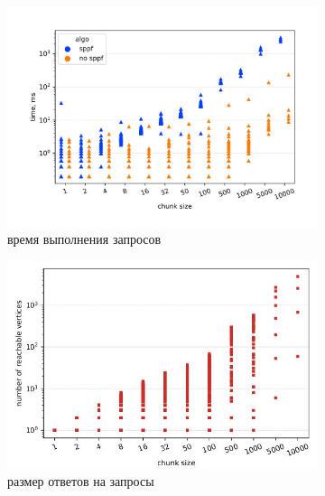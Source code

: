 \documentclass[14pt]{matmex-diploma-custom}
\theoremstyle{definition}
\begin{document}
    \begin{figure}[H]
    \begin{center}
    \begin{subfigure}[b]{0.8\textwidth}
    \includegraphics[width=\textwidth]{pics/enzyme_sppf_subclass.pdf_1.jpg} \caption{время выполнения запросов}
    \label{fig:subim1}
    \end{subfigure}%
    \end{center}
    \begin{subfigure}[b]{0.5\textwidth}
    \centering
    \includegraphics[width=\columnwidth]{pics/enzyme_subclass_ans_st.pdf_1.jpg} \caption{размер ответов на запросы}
    \label{fig:subim2}
    \end{subfigure}
    \begin{subfigure}[b]{0.5\textwidth}
    \centering

\end{subfigure}
\end{figure}
\end{document}
